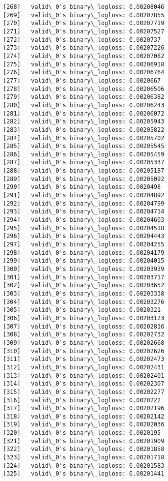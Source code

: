 \documentclass[11pt]{article}
\begin{document}
\begin{Verbatim}[commandchars=\\\{\}]
[268]	valid\_0's binary\_logloss: 0.00208046
[269]	valid\_0's binary\_logloss: 0.00207855
[270]	valid\_0's binary\_logloss: 0.00207719
[271]	valid\_0's binary\_logloss: 0.00207527
[272]	valid\_0's binary\_logloss: 0.0020737
[273]	valid\_0's binary\_logloss: 0.00207226
[274]	valid\_0's binary\_logloss: 0.00207082
[275]	valid\_0's binary\_logloss: 0.00206918
[276]	valid\_0's binary\_logloss: 0.00206764
[277]	valid\_0's binary\_logloss: 0.0020667
[278]	valid\_0's binary\_logloss: 0.00206506
[279]	valid\_0's binary\_logloss: 0.00206382
[280]	valid\_0's binary\_logloss: 0.00206243
[281]	valid\_0's binary\_logloss: 0.00206072
[282]	valid\_0's binary\_logloss: 0.00205943
[283]	valid\_0's binary\_logloss: 0.00205822
[284]	valid\_0's binary\_logloss: 0.00205702
[285]	valid\_0's binary\_logloss: 0.00205545
[286]	valid\_0's binary\_logloss: 0.00205459
[287]	valid\_0's binary\_logloss: 0.00205337
[288]	valid\_0's binary\_logloss: 0.00205187
[289]	valid\_0's binary\_logloss: 0.00205092
[290]	valid\_0's binary\_logloss: 0.0020498
[291]	valid\_0's binary\_logloss: 0.00204892
[292]	valid\_0's binary\_logloss: 0.00204799
[293]	valid\_0's binary\_logloss: 0.00204714
[294]	valid\_0's binary\_logloss: 0.00204603
[295]	valid\_0's binary\_logloss: 0.00204518
[296]	valid\_0's binary\_logloss: 0.00204443
[297]	valid\_0's binary\_logloss: 0.00204255
[298]	valid\_0's binary\_logloss: 0.00204179
[299]	valid\_0's binary\_logloss: 0.00204015
[300]	valid\_0's binary\_logloss: 0.00203939
[301]	valid\_0's binary\_logloss: 0.00203717
[302]	valid\_0's binary\_logloss: 0.00203652
[303]	valid\_0's binary\_logloss: 0.00203338
[304]	valid\_0's binary\_logloss: 0.00203276
[305]	valid\_0's binary\_logloss: 0.0020321
[306]	valid\_0's binary\_logloss: 0.00203123
[307]	valid\_0's binary\_logloss: 0.00202816
[308]	valid\_0's binary\_logloss: 0.00202732
[309]	valid\_0's binary\_logloss: 0.00202668
[310]	valid\_0's binary\_logloss: 0.00202626
[311]	valid\_0's binary\_logloss: 0.00202473
[312]	valid\_0's binary\_logloss: 0.00202431
[313]	valid\_0's binary\_logloss: 0.00202401
[314]	valid\_0's binary\_logloss: 0.00202307
[315]	valid\_0's binary\_logloss: 0.00202277
[316]	valid\_0's binary\_logloss: 0.0020222
[317]	valid\_0's binary\_logloss: 0.00202196
[318]	valid\_0's binary\_logloss: 0.00202142
[319]	valid\_0's binary\_logloss: 0.00202036
[320]	valid\_0's binary\_logloss: 0.0020195
[321]	valid\_0's binary\_logloss: 0.00201909
[322]	valid\_0's binary\_logloss: 0.00201858
[323]	valid\_0's binary\_logloss: 0.00201718
[324]	valid\_0's binary\_logloss: 0.00201583
[325]	valid\_0's binary\_logloss: 0.00201441

\end{Verbatim}
\end{document}
